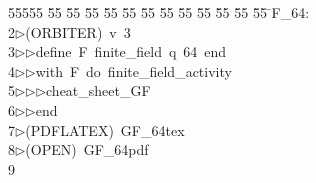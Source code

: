%
%
\begin{tabbing}
55555 \= 55 \= 55 \= 55 \= 55 \= 55 \= 55 \= 55 \= 55 \= 55 \= 55 \= 55 \= 55 \= \>F\_64:\\[0pt]
2\>$\triangleright$\>(ORBITER)\ v\ 3\ \\[0pt]
3\>$\triangleright$\>$\triangleright$\>define\ F\ finite\_field\ q\ 64\ end\ \\[0pt]
4\>$\triangleright$\>$\triangleright$\>with\ F\ do\ finite\_field\_activity\ \\[0pt]
5\>$\triangleright$\>$\triangleright$\>$\triangleright$\>cheat\_sheet\_GF\ \\[0pt]
6\>$\triangleright$\>$\triangleright$\>end\\[0pt]
7\>$\triangleright$\>(PDFLATEX)\ GF\_64tex\\[0pt]
8\>$\triangleright$\>(OPEN)\ GF\_64pdf\\[0pt]
9\>\end{tabbing}
